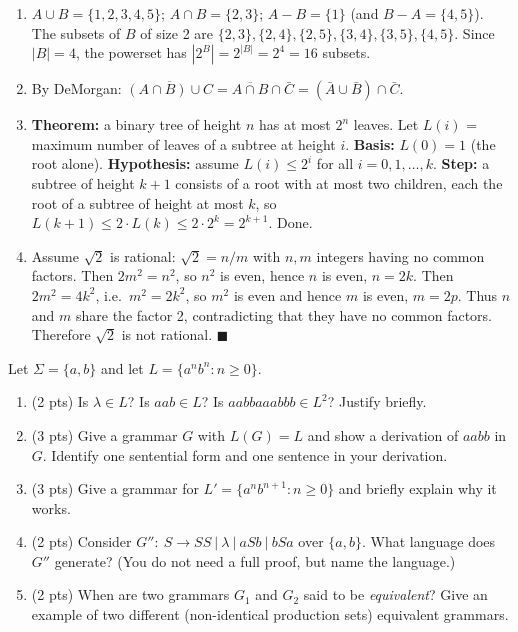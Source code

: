 \documentclass[11pt,a4paper]{article}
\newcounter{prob}
\newenvironment{problem}[1][]{%
  \refstepcounter{prob}%
  \begin{tcolorbox}[enhanced,breakable,colback=white,colframe=SteelBlue!70!black,
      boxrule=0.8pt,arc=1.5mm,left=5pt,right=5pt,top=3pt,bottom=3pt,
      before skip=8pt,after skip=8pt,
      title={\textbf{Question \theprob\ (#1)}},fonttitle=\bfseries, coltitle=white,
      colbacktitle=SteelBlue!70!black, boxed title style={arc=1mm}]}
{\end{tcolorbox}}
\newenvironment{solution}{%
  \begin{tcolorbox}[enhanced,breakable,colback=Honeydew!55,colframe=ForestGreen!60!black,
      boxrule=0.6pt,arc=1.5mm,left=5pt,right=5pt,top=3pt,bottom=3pt,
      before skip=6pt,after skip=10pt,
      title={\textbf{Solution \theprob}},fonttitle=\bfseries, coltitle=white,
      colbacktitle=ForestGreen!60!black, boxed title style={arc=1mm}]}
{\end{tcolorbox}}
\begin{document}
\begin{solution}
\begin{enumerate}[label=(\alph*)]
  \item $A\cup B=\{1,2,3,4,5\}$; $A\cap B=\{2,3\}$; $A-B=\{1\}$
  (and $B-A=\{4,5\}$). The subsets of $B$ of size 2 are
  $\{2,3\},\{2,4\},\{2,5\},\{3,4\},\{3,5\},\{4,5\}$. Since
  $|B|=4$, the powerset has $|2^B|=2^{|B|}=2^4=16$ subsets.
  \item By DeMorgan:
  $\overline{(A\cap B)\cup C}=\overline{A\cap B}\cap\bar C
  =(\bar A\cup\bar B)\cap\bar C$.
  \item \textbf{Theorem:} a binary tree of height $n$ has at most
  $2^n$ leaves. Let $L(i)$ = maximum number of leaves of a subtree at
  height $i$. \textbf{Basis:} $L(0)=1$ (the root alone).
  \textbf{Hypothesis:} assume $L(i)\le 2^i$ for all $i=0,1,\dots,k$.
  \textbf{Step:} a subtree of height $k+1$ consists of a root with at
  most two children, each the root of a subtree of height at most $k$,
  so $L(k+1)\le 2\cdot L(k)\le 2\cdot 2^k=2^{k+1}$. Done.
  \item Assume $\sqrt2$ is rational: $\sqrt2=n/m$ with $n,m$
  integers having no common factors. Then $2m^2=n^2$, so $n^2$ is
  even, hence $n$ is even, $n=2k$. Then $2m^2=4k^2$, i.e.\ $m^2=2k^2$,
  so $m^2$ is even and hence $m$ is even, $m=2p$. Thus $n$ and $m$
  share the factor 2, contradicting that they have no common factors.
  Therefore $\sqrt2$ is not rational. \hfill$\blacksquare$\ 
\end{enumerate}
\end{solution}

\begin{problem}[Languages and Grammars -- 12 points]
Let $\Sigma=\{a,b\}$ and let $L=\{a^nb^n:n\ge0\}$.
\begin{enumerate}[label=(\alph*)]
  \item (2 pts) Is $\lambda\in L$? Is $aab\in L$? Is $aabbaaabbb\in L^2$? Justify briefly.
  \item (3 pts) Give a grammar $G$ with $L(G)=L$ and show a derivation of $aabb$ in $G$. Identify one sentential form and one sentence in your derivation.
  \item (3 pts) Give a grammar for $L'=\{a^nb^{n+1}:n\ge0\}$ and briefly explain why it works.
  \item (2 pts) Consider $G'':\ S\to SS\ |\ \lambda\ |\ aSb\ |\ bSa$ over $\{a,b\}$.
  What language does $G''$ generate? (You do not need a full proof, but name the language.)
  \item (2 pts) When are two grammars $G_1$ and $G_2$ said to be \emph{equivalent}? Give an example of two different (non-identical production sets) equivalent grammars.
\end{enumerate}
\end{problem}
\end{document}
